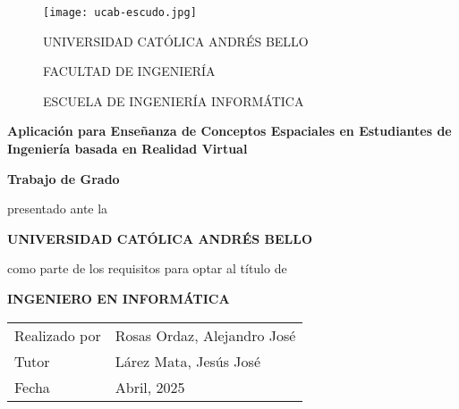 \newcommand{\touppercase}[1]{\MakeUppercase{#1}}

\newcommand{\universidad}{Universidad Católica Andrés Bello}
\newcommand{\titulo}{Aplicación para Enseñanza de Conceptos Espaciales en Estudiantes de Ingeniería basada en Realidad Virtual \\}
\newcommand{\estudiante}{Rosas Ordaz, Alejandro José}
\newcommand{\tutor}{Lárez Mata, Jesús José}

\newcommand{\membrete}{
  \normalsize\selectfont
  \touppercase{\universidad} \par
  FACULTAD DE INGENIERÍA \par
  ESCUELA DE INGENIERÍA INFORMÁTICA \par
}

\newcommand{\prelude}{
  \textbf{Trabajo de Grado} \par
  presentado ante la \par
  \touppercase{\textbf{\universidad}} \par
  como parte de los requisitos para optar al título de \par
  \touppercase{\textbf{Ingeniero en Informática}} \par
}

\newcommand{\details}{
  \begin{tabularx}{\textwidth}{X >{\hsize=1.35\hsize}X}
    Realizado por & \estudiante \\
    Tutor         & \tutor      \\
    Fecha         & Abril, 2025 \\
  \end{tabularx}
}

\begin{center}
  \begin{figure}[h]
    \centering
    \begin{minipage}{0.15\textwidth}
      \texttt{[image: ucab-escudo.jpg]}
    \end{minipage}
    \begin{minipage}{0.7\textwidth}
      \centering
      \renewcommand{\baselinestretch}{1.5}
      \membrete
    \end{minipage}
  \end{figure}
  \vspace*{\fill}
  \textbf{\titulo}
  \vspace*{\fill}
  \prelude
  \vspace*{\fill}
  \details
\end{center}

\clearpage
